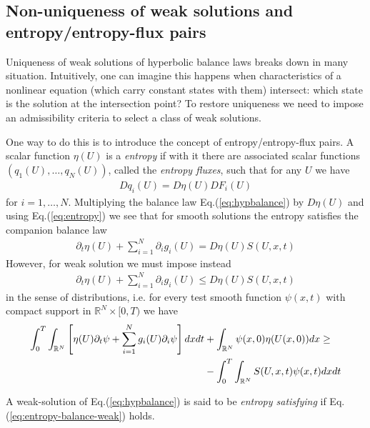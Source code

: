 \documentclass[11pt, reqno]{amsart}
\newcommand{\eqr}[1]{Eq.\thinspace(#1)}
\newcommand{\spfrac}[2]{{\partial_{#1}} {#2}}
\theoremstyle{definition}
\begin{document}
\subsection{Non-uniqueness of weak solutions and entropy/entropy-flux pairs}

Uniqueness of weak solutions of hyperbolic balance laws breaks down in
many situation. Intuitively, one can imagine this happens when
characteristics of a nonlinear equation (which carry constant states
with them) intersect: which state is the solution at the intersection
point?  To restore uniqueness we need to impose an admissibility
criteria to select a class of weak solutions.

One way to do this is to introduce the concept of entropy/entropy-flux
pairs. A scalar function $\eta(U)$ is a \emph{entropy} if with it
there are associated scalar functions $\left(q_1(U), \ldots,
  q_N(U)\right)$, called the \emph{entropy fluxes}, such that for any
$U$ we have
\begin{align}
  Dq_i(U) = D\eta(U) DF_i(U) \label{eq:entropy}
\end{align}
for $i=1,\ldots,N$. Multiplying the balance law
\eqr{\ref{eq:hypbalance}} by $D\eta(U)$ and using
\eqr{\ref{eq:entropy}} we see that for smooth solutions the entropy
satisfies the companion balance law
\begin{align}
  \spfrac{t}{\eta(U)} 
  +
  \sum_{i=1}^N \spfrac{i}{g_i(U)} 
  =
  D\eta(U) S(U,x,t) 
  \label{eq:entropy-balance}
\end{align}
However, for weak solution we must impose instead
\begin{align}
  \spfrac{t}{\eta(U)} 
  +
  \sum_{i=1}^N \spfrac{i}{g_i(U)} 
  \le
  D\eta(U) S(U,x,t)   
  \label{eq:entropy-balance-weak}
\end{align}
in the sense of distributions, i.e. for every test smooth function
$\psi(x,t)$ with compact support in $\mathbb{R}^N\times[0,T)$ we have
\begin{align}
  \int_0^T\int_{\mathbb{R}^N}
  \left[
    \eta(U)\spfrac{t}{\psi}
    +
    \sum_{i=1}^N g_i(U)\spfrac{i}{\psi}
  \right]
  dx dt
  &+
  \int_{\mathbb{R}^N}
  \psi(x,0)\eta(U(x,0)) dx
  \ge \notag \\
  &-
  \int_0^T\int_{\mathbb{R}^N}
  S(U,x,t)\psi(x,t)
  dx dt  
\end{align}

A weak-solution of \eqr{\ref{eq:hypbalance}} is said to be
\emph{entropy satisfying} if \eqr{\ref{eq:entropy-balance-weak}}
holds.
\end{document}
